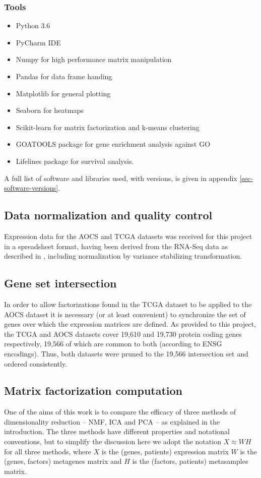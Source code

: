\documentclass[draft, tikz, 12pt,a4paper,oneside,fleqn]{article}
\begin{document}
\subsubsection{Tools}
\begin{itemize}
\item Python 3.6
\item PyCharm IDE
\item Numpy for high performance matrix manipulation
\item Pandas for data frame handing
\item Matplotlib for general plotting
\item Seaborn for heatmaps
\item Scikit-learn for matrix factorization and k-means clustering
\item GOATOOLS package for gene enrichment analysis against GO
\item Lifelines package for survival analysis.
\end{itemize}

A full list of software and libraries used, with versions, is given in appendix \ref{sec-software-versions}.

\subsection{Data normalization and quality control}

Expression data for the AOCS and TCGA datasets was received for this project in a spreadsheet format, having been derived from the RNA-Seq data as described in \cite{Ewing2020}, including  normalization by variance stabilizing transformation.   

\subsection{Gene set intersection}
\label{sec:gene-set-intersection}

In order to allow factorizations found in the TCGA dataset to be applied to the AOCS dataset it is necessary (or at least convenient) to synchronize the set of genes over which the expression matrices are defined.   As provided to this project, the TCGA and AOCS datasets cover 19,610 and 19,730 protein coding genes respectively, 19,566 of which are common to both (according to ENSG encodings).  Thus, both datasets were pruned to the 19,566 intersection set and ordered consistently.

\subsection{Matrix factorization computation}
One of the aims of this work is to compare the efficacy of three methods of dimensionality reduction -- NMF, ICA and PCA -- as explained in the introduction.   The three methods have different properties and notational conventions, but to simplify the discussion here we adopt the notation $X \approx W H$ for all three methods, where $X$ is the (genes, patients) expression matrix  $W$ is the (genes, factors) metagenes matrix and $H$ is the (factors, patients) metasamples matrix.   
\end{document}
